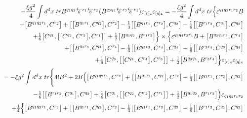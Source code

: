 \documentclass[10pt]{article}
\begin{document}
 \begin{eqnarray}\label{yb4presfin}
    && -  \frac{\xi g^2}{4} \int d^dx \ tr  B^{q_1q_2}\overleftarrow{s}{}^{r_1}\overleftarrow{s}{}^{r_2}\big(B^{q_3q_4} \overleftarrow{s}{}^{r_3}\overleftarrow{s}{}^{r_4}\big)\varepsilon_{[r]_4}\varepsilon_{[q]_4} = -  \frac{\xi g^2}{4} \int d^dx \ tr  \Big\{\varepsilon^{q_1q_2r_1r_2}{B}\nonumber \\
&& \quad +\big[B^{q_1q_2r_1},C^{r_2}\big]+\big[\big[B^{q_1r_1},C^{q_2}\big],C^{r_2}\big]\hspace{-0.1em}   -\textstyle\frac{1}{3}\big[\big[B^{q_1r_1},C^{r_2}\big],C^{q_2}\big]- \textstyle\frac{1}{6}\big[\big[B^{r_1r_2},C^{q_1}\big],C^{q_2}\big]\nonumber \\
&& \quad
+\textstyle\frac{1}{6}\big[C^{q_1},\big[\big[C^{q_2},\,C^{r_2}\big] , C^{r_1}\big]\big]  +
 \textstyle\frac{1}{2}
\big[B^{q_1q_2}, B^{r_1r_2}\big] \Big\}\times \Big\{\varepsilon^{q_3q_4r_3r_4}{B}+\big[B^{q_3q_4r_3},C^{r_4}\big]\nonumber \\
&& \quad +\big[\big[B^{q_3r_3},C^{q_4}\big],C^{r_4}\big]\hspace{-0.1em}   -\textstyle\frac{1}{3}\big[\big[B^{q_3r_3},C^{r_4}\big],C^{q_4}\big]- \textstyle\frac{1}{6}\big[\big[B^{r_3r_4},C^{q_3}\big],C^{q_4}\big]\nonumber \\
&& \quad
+\textstyle\frac{1}{6}\big[C^{q_3},\big[\big[C^{q_4},\,C^{r_4}\big] , C^{r_3}\big]\big]  +
 \textstyle\frac{1}{2}
\big[B^{q_3q_4}, B^{r_3r_4}\big] \Big\}\varepsilon_{[r]_4}\varepsilon_{[q]_4}  \nonumber \\
&& \ =   -  {\xi g^2} \int d^dx \ tr  \Bigg\{4! {B}^2  + 2 B \Big(\big[B^{q_1q_2r_1},C^{r_2}\big]+\big[\big[B^{q_1r_1},C^{q_2}\big],C^{r_2}\big]\hspace{-0.1em}
-\textstyle\frac{1}{3}\big[\big[B^{q_1r_1},C^{r_2}\big],C^{q_2}\big]\nonumber \\
&& \quad   - \textstyle\frac{1}{6}\big[\big[B^{r_1r_2},C^{q_1}\big],C^{q_2}\big]+\textstyle\frac{1}{6}\big[C^{q_1},\big[\big[C^{q_2},\,C^{r_2}\big] , C^{r_1}\big]\big]  +
 \textstyle\frac{1}{2}
\big[B^{q_1q_2}, B^{r_1r_2}\big] \Big)\varepsilon_{q_1q_2r_1r_2} \nonumber \\
&& \quad
 +  \textstyle\frac{1}{4}\Big\{\big[B^{q_1q_2r_1},C^{r_2}\big] +\big[\big[B^{q_1r_1},C^{q_2}\big],C^{r_2}\big]\hspace{-0.1em}   -\textstyle\frac{1}{3}\big[\big[B^{q_1r_1},C^{r_2}\big],C^{q_2}\big]- \textstyle\frac{1}{6}\big[\big[B^{r_1r_2},C^{q_1}\big],C^{q_2}\big]\nonumber \\

\end{eqnarray}
\end{document}
